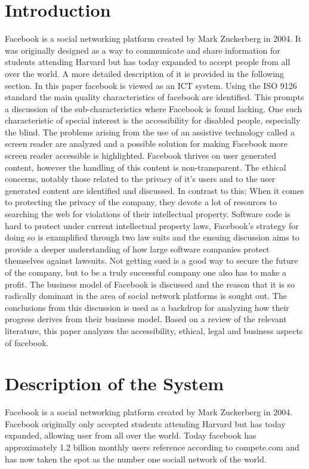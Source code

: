 \documentclass[conference]{IEEEtran}
\begin{document}
\section{Introduction}
Facebook is a social networking platform created by Mark Zuckerberg in 2004.
It was originally designed as a way to communicate and share information for
students attending Harvard but has today expanded to accept people from all
over the world. A more detailed description of it is provided in the following
section. In this paper facebook is viewed as an ICT system. Using the ISO 9126
standard the main quality characteristics of facebook are identified. This
prompts a discussion of the sub-characteristics where Facebook is found
lacking.  One such characteristic of special interest is the accessibility for
disabled people, especially the blind. The problems arising from the use of an
assistive technology called a screen reader are analyzed and a possible
solution for making Facebook more screen reader accessible is highlighted.
Facebook thrives on user generated content, however the handling of this
content is non-transparent. The ethical concerns, notably those related to the
privacy of it's users and to the user generated content are identified and
discussed. In contrast to this; When it comes to protecting the privacy of the
company, they devote a lot of resources to searching the web for violations of
their intellectual property.  Software code is hard to protect under current
intellectual property laws, Facebook's strategy for doing so is examplified
through two law suits and the ensuing discussion aims to provide a deeper
understanding of how large software companies protect themselves against
lawsuits. Not getting sued is a good way to secure the future of the company,
but to be a truly successful company one also has to make a profit. The
business model of Facebook is discussed and the reason that it is so radically
dominant in the area of social network platforms is sought out. The conclusions
from this discussion is used as a backdrop for analyzing how their progress
derives from their business model. Based on a review of the relevant
literature, this paper analyzes the accessibility, ethical, legal and business
aspects of facebook. 

\section{Description of the System}
\label{system}

Facebook is a social networking platform created by Mark Zuckerberg in 2004.
Facebook originally only accepted students attending Harvard but has today
expanded, allowing user from all over the world. Today facebook has
approximately 1.2 billion monthly users reference according to compete.com and
has now taken the spot as the number one sociall network of the world.
\end{document}
